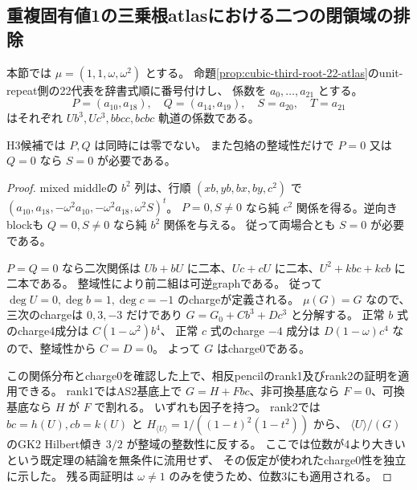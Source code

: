 \subsection{重複固有値1の三乗根atlasにおける二つの閉領域の排除}
\label{subsec:cubic-third-root-unit-closed-strata}
本節では $\mu=(1,1,\omega,\omega^2)$ とする。
命題\ref{prop:cubic-third-root-22-atlas}のunit-repeat側の22代表を辞書式順に番号付けし、
係数を $a_0,\ldots,a_{21}$ とする。
\[
 P=(a_{10},a_{18}),\quad Q=(a_{14},a_{19}),\quad S=a_{20},\quad T=a_{21}
\]
はそれぞれ $Ub^3,Uc^3,bbcc,bcbc$ 軌道の係数である。
\begin{proposition}[全cube結合が零の閉領域の排除]
\label{prop:cubic-third-root-unit-no-cube-coupling}
H3候補では $P,Q$ は同時には零でない。
また包絡の整域性だけで $P=0$ 又は $Q=0$ なら $S=0$ が必要である。
\end{proposition}
\begin{proof}
mixed middleの $b^2$ 列は、行順 $(xb,yb,bx,by,c^2)$ で
$(a_{10},a_{18},-\omega^2a_{10},-\omega^2a_{18},\omega^2S)^t$。
$P=0,S\ne0$ なら純 $c^2$ 関係を得る。逆向きblockも $Q=0,S\ne0$ なら純 $b^2$ 関係を与える。
従って両場合とも $S=0$ が必要である。

$P=Q=0$ なら二次関係は
$Ub+bU$ に二本、$Uc+cU$ に二本、$U^2+kbc+kcb$ に二本である。
整域性により前二組は可逆graphである。
従って $\deg U=0,\deg b=1,\deg c=-1$ のchargeが定義される。
$\mu(G)=G$ なので、三次のchargeは $0,3,-3$ だけであり
$G=G_0+C b^3+D c^3$ と分解する。
正常 $b$ 式のcharge4成分は $C(1-\omega^2)b^4$、
正常 $c$ 式のcharge $-4$ 成分は $D(1-\omega)c^4$ なので、整域性から $C=D=0$。
よって $G$ はcharge0である。

この関係分布とcharge0を確認した上で、相反pencilのrank1及びrank2の証明を適用できる。
rank1ではAS2基底上で $G=H+Fbc$、非可換基底なら $F=0$、可換基底なら $H$ が $F$ で割れる。
いずれも因子を持つ。
rank2では $bc=h(U),cb=k(U)$ と $H_{\langle U\rangle}=1/((1-t)^2(1-t^2))$ から、
$\langle U\rangle/(G)$ のGK2 Hilbert傾き $3/2$ が整域の整数性に反する。
ここでは位数が4より大きいという既定理の結論を無条件に流用せず、
その仮定が使われたcharge0性を独立に示した。
残る両証明は $\omega\ne1$ のみを使うため、位数3にも適用される。
\end{proof}

